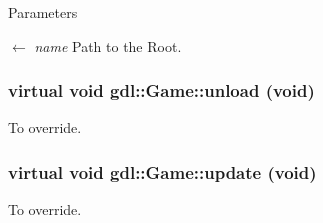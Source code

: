 \begin{DoxyParams}{Parameters}
\item[\mbox{$\leftarrow$} {\em name}]Path to the Root. \end{DoxyParams}
\hypertarget{classgdl_1_1Game_a34061b97583826e39d08d7e1c85a3c4c}{
\subsubsection[{unload}]{\setlength{\rightskip}{0pt plus 5cm}virtual void gdl::Game::unload (void)}}
\label{classgdl_1_1Game_a34061b97583826e39d08d7e1c85a3c4c}
To override. \hypertarget{classgdl_1_1Game_ad1a107e2c31850be6ee9df77e69d3714}{
\subsubsection[{update}]{\setlength{\rightskip}{0pt plus 5cm}virtual void gdl::Game::update (void)}}
\label{classgdl_1_1Game_ad1a107e2c31850be6ee9df77e69d3714}
To override. 

